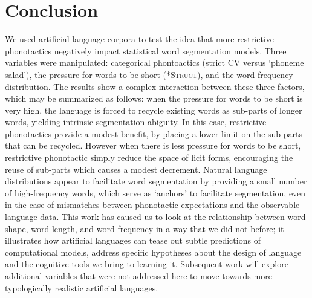 \documentclass[11pt]{article}
\begin{document}
\section{Conclusion}
\vspace*{-5pt}
We used artificial language corpora to test the idea that more restrictive phonotactics negatively impact statistical word segmentation models. Three variables were manipulated: categorical phontoactics (strict CV versus `phoneme salad'), the pressure for words to be short (\textsc{*Struct}), and the word frequency distribution. The results show a complex interaction between these three factors, which may be summarized as follows: when the pressure for words to be short is very high, the language is forced to recycle existing words as sub-parts of longer words, yielding intrinsic segmentation abiguity. In this case, restrictive phonotactics provide a modest benefit, by placing a lower limit on the sub-parts that can be recycled. However when there is less pressure for words to be short, restrictive phonotactic simply reduce the space of licit forms, encouraging the reuse of sub-parts which causes a modest decrement. Natural language distributions appear to facilitate word segmentation by providing a small number of high-frequency words, which serve as `anchors' to facilitate segmentation, even in the case of mismatches between phonotactic expectations and the observable language data. This work has caused us to look at the relationship between word shape, word length, and word frequency in a way that we did not before; it illustrates how artificial languages can tease out subtle predictions of computational models, address specific hypotheses about the design of language and the cognitive tools we bring to learning it. Subsequent work will explore additional variables that were not addressed here to move towards more typologically realistic artificial languages.



\end{document}
